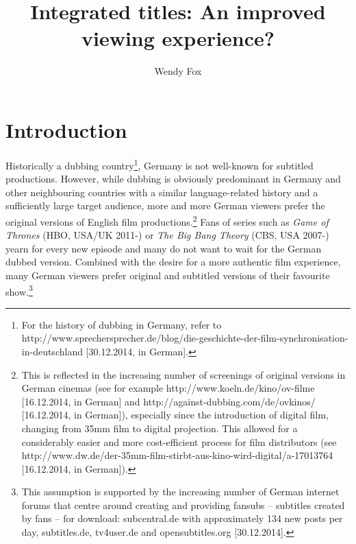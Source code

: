 \documentclass[output=paper]{langsci/langscibook}
\author{Wendy Fox\affiliation{Johannes Gutenberg University of Mainz in Germersheim}}
\title{Integrated titles: {A}n improved viewing experience?}
\begin{document}
   
\section{Introduction}

Historically a dubbing country\footnote{For the history of dubbing in Germany, refer to http://www.sprechersprecher.de/blog/die-geschichte-der-film-synchronisation-in-deutschland [30.12.2014, in German].}, 
Germany is not well-known for subtitled productions. However, while dubbing is obviously predominant in Germany and other neighbouring countries with a similar language-related history and a sufficiently large target audience, more and more German viewers prefer the original versions of English film productions.\footnote{This is reflected in the increasing number of screenings of original versions in German cinemas (see for example http://www.koeln.de/kino/ov-filme [16.12.2014, in German] and http://against-dubbing.com/de/ovkinos/ [16.12.2014, in German]), especially since the introduction of digital film, changing from 35mm film to digital projection. This allowed for a considerably easier and more cost-efficient process for film distributors (see http://www.dw.de/der-35mm-film-stirbt-aus-kino-wird-digital/a-17013764 [16.12.2014, in German]). 
} 
Fans of series such as \textit{Game of Thrones} (HBO, USA/UK 2011-) or \textit{The Big Bang Theory} (CBS, USA 2007-) yearn for every new episode and many do not want to wait for the German dubbed version. Combined with the desire for a more authentic film experience, many German viewers prefer original and subtitled versions of their favourite show.\footnote{This assumption is supported by the increasing number of German internet forums that centre around creating and providing fansubs – subtitles created by fans – for download: subcentral.de with approximately 134 new posts per day, subtitles.de, tv4user.de and opensubtitles.org [30.12.2014].
}
\end{document}
